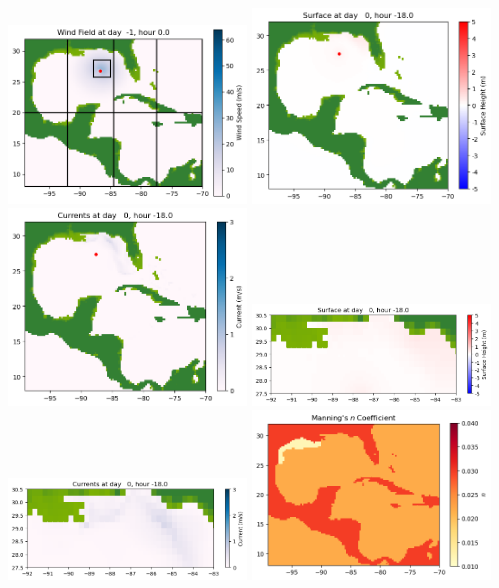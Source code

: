\documentclass[11pt]{article}
\begin{document}
\vskip 10pt 
\includegraphics[width=0.475\textwidth]{frame0004fig1007.png}
\vskip 10pt 
\includegraphics[width=0.475\textwidth]{frame0005fig1001.png}
\includegraphics[width=0.475\textwidth]{frame0005fig1002.png}
\vskip 10pt 
\includegraphics[width=0.475\textwidth]{frame0005fig1003.png}
\includegraphics[width=0.475\textwidth]{frame0005fig1004.png}
\vskip 10pt 
\includegraphics[width=0.475\textwidth]{frame0005fig1005.png}
\end{document}
